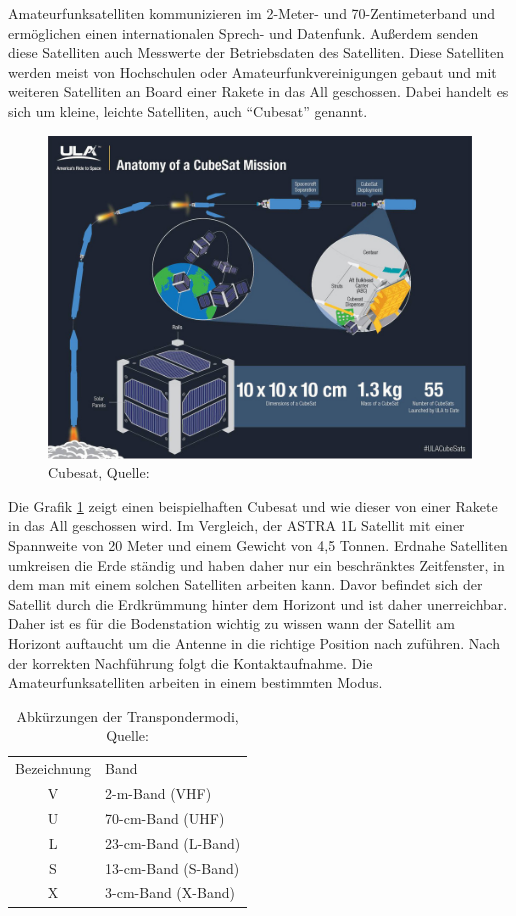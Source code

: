 Amateurfunksatelliten kommunizieren im 2-Meter- und 70-Zentimeterband \cite{Wiki:amateur} und ermöglichen einen 
internationalen Sprech- und Datenfunk. Außerdem senden diese Satelliten
auch Messwerte der Betriebsdaten des Satelliten. Diese Satelliten werden meist von Hochschulen oder Amateurfunkvereinigungen gebaut und mit weiteren 
Satelliten an Board einer Rakete in das All geschossen. Dabei handelt es sich um kleine, leichte Satelliten, auch ``Cubesat'' genannt.
\clearpage
\begin{figure}[h]
 \centering
 \includegraphics[width=0.8\linewidth]{./images/cubesat}
 \caption{Cubesat, Quelle: \cite{cubesat}}
 \label{fig:cubesat}
\end{figure}
Die Grafik \ref{fig:cubesat} zeigt einen beispielhaften Cubesat und wie dieser von einer Rakete in 
das All geschossen wird. Im Vergleich, der ASTRA 1L Satellit mit 
einer Spannweite von 20 Meter und einem Gewicht von 4,5 Tonnen. Erdnahe Satelliten umkreisen die 
Erde ständig und haben daher nur ein beschränktes 
Zeitfenster, in dem man mit einem solchen Satelliten arbeiten kann. Davor befindet sich der Satellit durch die Erdkrümmung hinter dem Horizont und 
ist daher unerreichbar. Daher ist es für die Bodenstation wichtig zu wissen wann der Satellit am Horizont auftaucht um die Antenne in die richtige 
Position nach zuführen. Nach der korrekten Nachführung folgt die Kontaktaufnahme. Die 
Amateurfunksatelliten arbeiten in einem bestimmten Modus. 
\begin{table}[h]
	\centering
	\caption[Abkürzungen der Transpondermodi]{Abkürzungen der Transpondermodi, Quelle: \cite{amateursat}}
	\begin{tabular}{c|l}
		Bezeichnung & Band\\ 
		V & 2-m-Band (VHF)\\
		U & 70-cm-Band (UHF)\\
		L & 23-cm-Band (L-Band)\\
		S & 13-cm-Band (S-Band)\\
		X & 3-cm-Band (X-Band)\\
	\end{tabular} 
	\label{tab:modi}
\end{table}
